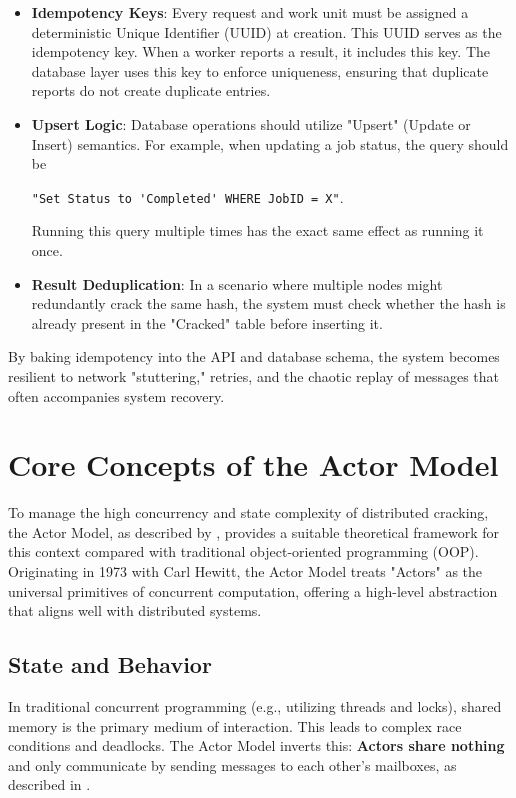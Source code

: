 \begin{itemize}
    \item \textbf{Idempotency Keys}: Every request and work unit must be assigned a deterministic Unique Identifier (UUID) at creation. This UUID serves as the idempotency key. When a worker reports a result, it includes this key. The database layer uses this key to enforce uniqueness, ensuring that duplicate reports do not create duplicate entries.

    \item \textbf{Upsert Logic}: Database operations should utilize "Upsert" (Update or Insert) semantics. For example, when updating a job status, the query should be
    
       \verb|"Set Status to 'Completed' WHERE JobID = X"|.
    
       Running this query multiple times has the exact same effect as running it once.

    \item \textbf{Result Deduplication}: In a scenario where multiple nodes might redundantly crack the same hash, the system must check whether the hash is already present in the "Cracked" table before inserting it.
\end{itemize}

By baking idempotency into the API and database schema, the system becomes resilient to network "stuttering," retries, and the chaotic replay of messages that often accompanies system recovery.

\newpage
\section{Core Concepts of the Actor Model}
\label{sec:core_actor_concepts}

To manage the high concurrency and state complexity of distributed cracking, the Actor Model, as described by \cite{enwiki:1323072662}, provides a suitable theoretical framework for this context compared with traditional object-oriented programming (OOP). Originating in 1973 with Carl Hewitt, the Actor Model treats "Actors" as the universal primitives of concurrent computation, offering a high-level abstraction that aligns well with distributed systems.

\subsection{State and Behavior}

In traditional concurrent programming (e.g., utilizing threads and locks), shared memory is the primary medium of interaction. This leads to complex race conditions and deadlocks. The Actor Model inverts this: \textbf{Actors share nothing} and only communicate by sending messages to each other's mailboxes, as described in \cite{actor_model_understanding}.

